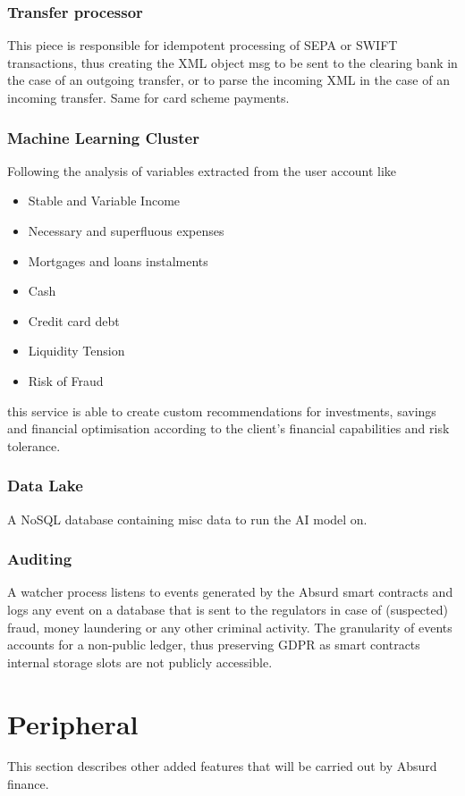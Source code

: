 \documentclass[a4paper,10 pt]{article}
\theoremstyle{definition}
\begin{document}
\subsubsection{Transfer processor}
This piece is responsible for idempotent processing of SEPA or SWIFT transactions, thus creating the XML object msg to be sent to the clearing bank in the case of an outgoing transfer, or to parse the incoming XML in the case of an incoming transfer. Same for card scheme payments.

\subsubsection{Machine Learning Cluster}
Following the analysis of variables extracted from the user account like
\begin{itemize}
\item{} Stable and Variable Income
\item{} Necessary and superfluous expenses
\item{} Mortgages and loans instalments
\item{} Cash 
\item{} Credit card debt
\item{} Liquidity Tension
\item{} Risk of Fraud
\end{itemize}

this service is able to create custom recommendations for investments, savings and financial optimisation according to the client's financial capabilities and risk tolerance.

\subsubsection{Data Lake}
A NoSQL database containing misc data to run the AI model on.

\subsubsection{Auditing}
A watcher process listens to events generated by the Absurd smart contracts and logs any event on a database that is sent to the regulators in case of (suspected) fraud, money laundering or any other criminal activity. The granularity of events accounts for a non-public ledger, thus preserving GDPR as smart contracts internal storage slots are not publicly accessible.

\newpage

\section{Peripheral}
This section describes other added features that will be carried out by Absurd finance.
\end{document}
